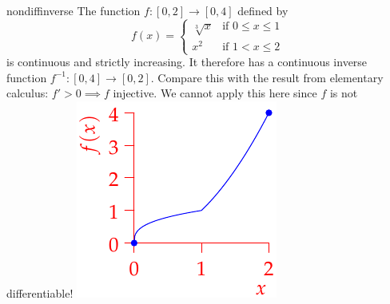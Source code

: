 \begin{example}[lower separated=false, sidebyside, sidebyside align=top seam, sidebyside gap=0pt, righthand width=0.3\linewidth]{}{nondiffinverse}
	The function $f:[0,2]\to[0,4]$ defined by
	\[
		f(x)=
		\begin{cases}
			\sqrt[3]{x}&\text{if }0\le x\le 1\\
			x^2&\text{if }1<x\le 2
		\end{cases}
	\]
	is continuous and strictly increasing. It therefore has a continuous inverse function $f^{-1}:[0,4]\to[0,2]$.\smallbreak
	Compare this with the result from elementary calculus: $f'>0\implies f$ injective. We cannot apply this here since $f$ is not differentiable!
	\tcblower
	\flushright\includegraphics{inversecont}
\end{example}


